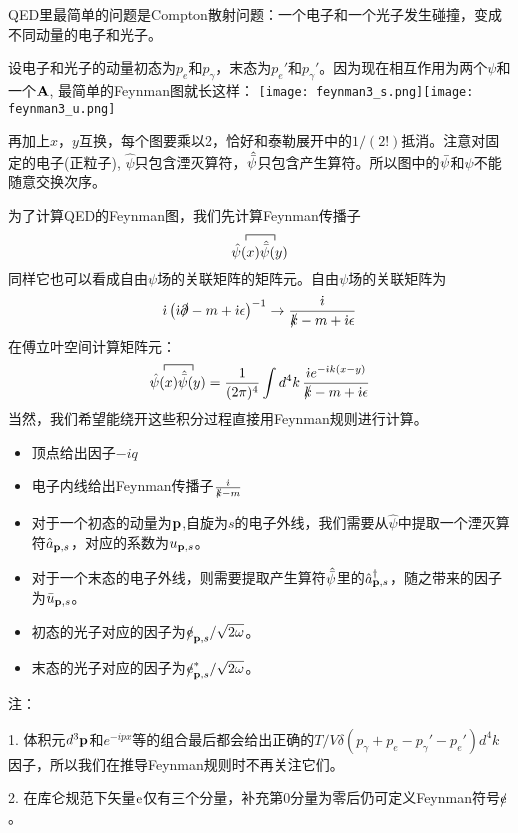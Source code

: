\documentclass[CJK]{beamer}
\begin{document}
\begin{frame}
\bch
{\small
QED里最简单的问题是Compton散射问题：一个电子和一个光子发生碰撞，变成不同动量的电子和光子。
\skipline

设电子和光子的动量初态为$p_e$和$p_\gamma$，末态为$p_e'$和$p_\gamma'$。因为现在相互作用为两个$\psi$和一个${\mathbf{A}}$, 最简单的Feynman图就长这样：
\texttt{[image: feynman3\_s.png]}\texttt{[image: feynman3\_u.png]}

再加上$x$，$y$互换，每个图要乘以2，恰好和泰勒展开中的$1/(2!)$抵消。注意对固定的电子(正粒子), $\hat\psi$只包含湮灭算符，$\hat{\bar{\psi}}$只包含产生算符。所以图中的$\bar{\psi}$和$\psi$不能随意交换次序。}
\ech
\end{frame}


\begin{frame}
\bch
为了计算QED的Feynman图，我们先计算Feynman传播子
$$\contr{\hat\psi(x)}{\hat{\barpsi}(y)}$$
同样它也可以看成自由$\psi$场的关联矩阵的矩阵元。自由$\psi$场的关联矩阵为
$$ {\dot{\imath}}\left({\dot{\imath}} \slashed{\partial}-m + {\dot{\imath}}\epsilon\right)^{-1} \rightarrow \frac{{\dot{\imath}}}{\slashed{k} - m + {\dot{\imath}}\epsilon}$$
在傅立叶空间计算矩阵元：
$$\contr{\hat\psi(x)}{\hat{\barpsi}(y)} = \frac{1}{(2\pi)^4}\int d^4k\, \frac{\ii e^{-\ii k(x-y)}}{\slashed{k} - m + \ii\epsilon} $$
当然，我们希望能绕开这些积分过程直接用Feynman规则进行计算。
\ech
\end{frame}

\begin{frame}
\bch
{\small
\begin{itemize}
\item{顶点给出因子$-iq$}
\item{电子内线给出Feynman传播子$\frac{{\dot{\imath}}}{\slashed{k}-m}$}
\item{对于一个初态的动量为${\mathbf{p}}$,自旋为$s$的电子外线，我们需要从$\hat\psi$中提取一个湮灭算符${\hat{a}}_{{\mathbf{p}},s}$，对应的系数为$u_{{\mathbf{p}}, s}$。}
\item{对于一个末态的电子外线，则需要提取产生算符$\hat{\bar{\psi}}$里的${\hat{a}^\dagger}_{{\mathbf{p}},s}$，随之带来的因子为$\bar{u}_{{\mathbf{p}},s}$。}
\item{初态的光子对应的因子为$\slashed{\mathrm{e}}_{{\mathbf{p}},s}/\sqrt{2\omega}$。}
\item{末态的光子对应的因子为$\slashed{\mathrm{e}}^*_{{\mathbf{p}},s}/\sqrt{2\omega}$。}
\end{itemize}

{\scriptsize
注：

1. 体积元$d^3{\mathbf{p}}$和$e^{-ipx}$等的组合最后都会给出正确的$T/V\delta(p_\gamma+p_e - p_\gamma'-p_e')d^4k$因子，所以我们在推导Feynman规则时不再关注它们。

2. 在库仑规范下矢量$\mathrm{e}$仅有三个分量，补充第0分量为零后仍可定义Feynman符号$\slashed{\mathrm{e}}$。}

}

\ech
\end{frame}
\end{document}
